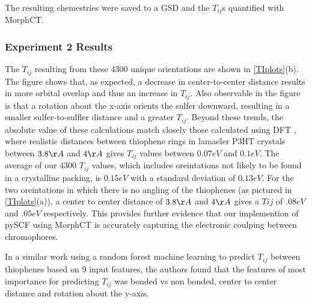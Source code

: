 The resulting chemestries were saved to a GSD and the $T_{ij}$s quantified with MorphCT. 

\subsubsection{Experiment 2 Results}

The $T_{ij}$ resulting from these 4300 unique orientations are shown in \autoref{TIplots}(b). 
The figure shows that, as expected, a decrease in 
center-to-center distance results in more orbital overlap and thus an increase in $T_{ij}$. 
Also observable in the figure is that
a rotation about the x-axis orients the sulfer downward, resulting in a smaller sulfer-to-sulfler distance 
and a greater $T_{ij}$. Beyond these trends, the absolute value of these calculations match closely those
calculated using DFT \cite{Lan2008}, where realistic distances between thiophene rings in lamaeler P3HT
crystals between $3.8\AA$ and $4 \AA$ gives $T_{ij}$ values between $0.07eV$ and $0.1eV$. The average of our
$4300$ $T_{ij}$ values, which includes oreintations not likely to be found in a crystalline packing,
is $0.15eV$ with a standard deviation of $0.13eV$. For the two oreintations in which there is no angling of
the thiophenes (as pictured in \autoref{TIplots}(a)), a center to center distance of $3.8\AA$ and $4 \AA$
gives a $T{ij}$ of $.08eV$ and $.05eV$ respectively. This provides further evidence that
our implemention of pySCF using MorphCT is accurately capturing the electronic coulping between chromophores.

In a similar work using a random forest machine learning to predict $T_{ij}$
between thiophenes based on 9 input features, the authors found that the
features of most importance for predicting $T_{ij}$ was bonded vs non bonded,
center to center distance and rotation about the y-axis. \cite{Jankowski2019c}

